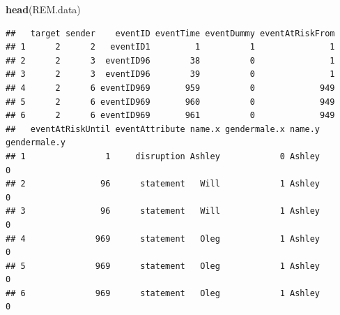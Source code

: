 \documentclass[
]{article}
\newenvironment{Shaded}{\begin{snugshade}}{\end{snugshade}}
\newcommand{\AttributeTok}[1]{\textcolor[rgb]{0.13,0.29,0.53}{#1}}
\newcommand{\FunctionTok}[1]{\textcolor[rgb]{0.13,0.29,0.53}{\textbf{#1}}}
\newcommand{\NormalTok}[1]{#1}
\newcommand{\OtherTok}[1]{\textcolor[rgb]{0.56,0.35,0.01}{#1}}
\newcommand{\SpecialCharTok}[1]{\textcolor[rgb]{0.81,0.36,0.00}{\textbf{#1}}}
\begin{document}
\begin{Shaded}
\begin{Highlighting}[]
\FunctionTok{head}\NormalTok{(REM.data)}
\end{Highlighting}
\end{Shaded}

\begin{verbatim}
##   target sender    eventID eventTime eventDummy eventAtRiskFrom
## 1      2      2   eventID1         1          1               1
## 2      2      3  eventID96        38          0               1
## 3      2      3  eventID96        39          0               1
## 4      2      6 eventID969       959          0             949
## 5      2      6 eventID969       960          0             949
## 6      2      6 eventID969       961          0             949
##   eventAtRiskUntil eventAttribute name.x gendermale.x name.y gendermale.y
## 1                1     disruption Ashley            0 Ashley            0
## 2               96      statement   Will            1 Ashley            0
## 3               96      statement   Will            1 Ashley            0
## 4              969      statement   Oleg            1 Ashley            0
## 5              969      statement   Oleg            1 Ashley            0
## 6              969      statement   Oleg            1 Ashley            0
\end{verbatim}

\begin{Shaded}
\end{Shaded}
\end{document}
